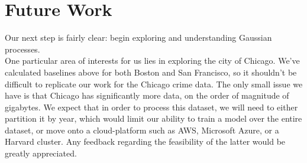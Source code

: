 \documentclass[11pt]{article}
\begin{document}
\section{Future Work}
Our next step is fairly clear: begin exploring and understanding Gaussian processes. \\

One particular area of interests for us lies in exploring the city of Chicago. We've calculated baselines above for both Boston and San Francisco, so it shouldn't be difficult to replicate our work for the Chicago crime data. The only small issue we have is that Chicago has significantly more data, on the order of magnitude of gigabytes. We expect that in order to process this dataset, we will need to either partition it by year, which would limit our ability to train a model over the entire dataset, or move onto a cloud-platform such as AWS, Microsoft Azure, or a Harvard cluster. Any feedback regarding the feasibility of the latter would be greatly appreciated. \\

{}

\end{document}

